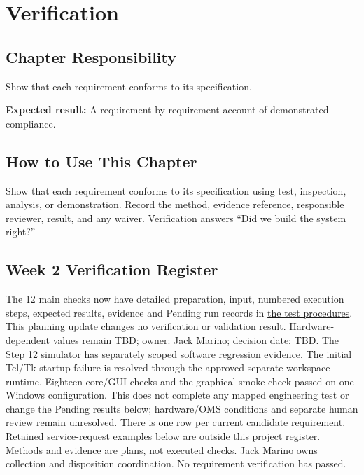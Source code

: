 \chapter{Verification}
\section{Chapter Responsibility}
\label{Section:VerificationResponsibility}
Show that each requirement conforms to its specification.

\noindent\textbf{Expected result:} A requirement-by-requirement account of demonstrated compliance.

\section{How to Use This Chapter}
Show that each requirement conforms to its specification using test, inspection, analysis, or demonstration. Record the method, evidence reference, responsible reviewer, result, and any waiver.
Verification answers ``Did we build the system right?''

\section{Week 2 Verification Register}
\label{Section:WeekTwoVerification}
The 12 main checks now have detailed preparation, input, numbered execution steps, expected results, evidence and Pending run records in \hyperref[Section:MainTestProcedures]{the test procedures}. This planning update changes no verification or validation result. Hardware-dependent values remain TBD; owner: Jack Marino; decision date: TBD.
The Step 12 simulator has \hyperref[Section:SimulatorEvidence]{separately scoped software regression evidence}. The initial Tcl/Tk startup failure is resolved through the approved separate workspace runtime. Eighteen core/GUI checks and the graphical smoke check passed on one Windows configuration. This does not complete any mapped engineering test or change the Pending results below; hardware/OMS conditions and separate human review remain unresolved.
There is one row per current candidate requirement. Retained service-request
examples below are outside this project register. Methods and evidence are
plans, not executed checks. Jack Marino owns collection and disposition
coordination. No requirement verification has passed.

